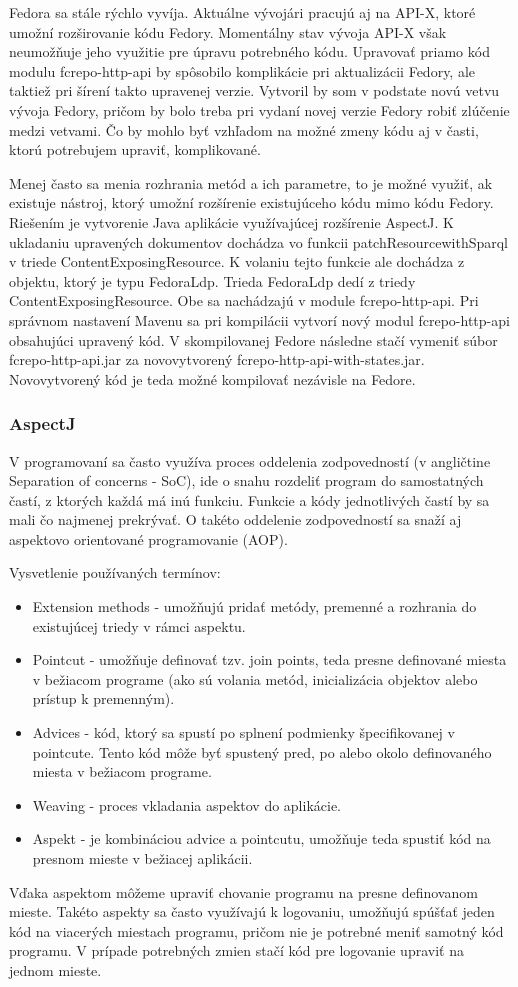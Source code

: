 \documentclass[thesis=M,slovak]{FITthesis}[2013/05/06]
\begin{document}
Fedora sa stále rýchlo vyvíja. Aktuálne vývojári pracujú aj na API-X, ktoré umožní rozširovanie kódu Fedory. Momentálny stav vývoja API-X však neumožňuje jeho využitie pre úpravu potrebného kódu. Upravovať priamo kód modulu fcrepo-http-api by spôsobilo komplikácie pri aktualizácii Fedory, ale taktiež pri šírení takto upravenej verzie. Vytvoril by som v podstate novú vetvu vývoja Fedory, pričom by bolo treba pri vydaní novej verzie Fedory robiť zlúčenie medzi vetvami. Čo by mohlo byť vzhľadom na možné zmeny kódu aj v časti, ktorú potrebujem upraviť, komplikované.

Menej často sa menia rozhrania metód a ich parametre, to je možné využiť, ak existuje nástroj, ktorý umožní rozšírenie existujúceho kódu mimo kódu Fedory. Riešením je vytvorenie Java aplikácie využívajúcej rozšírenie AspectJ. K ukladaniu upravených dokumentov dochádza vo funkcii patchResourcewithSparql v triede ContentExposingResource. K volaniu tejto funkcie ale dochádza z objektu, ktorý je typu FedoraLdp. Trieda FedoraLdp dedí z triedy ContentExposingResource. Obe sa nachádzajú v module fcrepo-http-api. Pri správnom nastavení Mavenu sa pri kompilácii vytvorí nový modul fcrepo-http-api obsahujúci upravený kód. V skompilovanej Fedore následne stačí vymeniť súbor fcrepo-http-api.jar za novovytvorený fcrepo-http-api-with-states.jar. Novovytvorený kód je teda možné kompilovať nezávisle na Fedore.

\subsubsection{AspectJ}
V programovaní sa často využíva proces oddelenia zodpovedností (v angličtine Separation of concerns - SoC), ide o snahu rozdeliť program do samostatných častí, z ktorých každá má inú funkciu. Funkcie a kódy jednotlivých častí by sa mali čo najmenej prekrývať. O takéto oddelenie zodpovedností sa snaží aj aspektovo orientované programovanie (AOP).

Vysvetlenie používaných termínov:
\begin{itemize}
	\item Extension methods - umožňujú pridať metódy, premenné a rozhrania do existujúcej triedy v rámci aspektu.
	\item Pointcut - umožňuje definovať tzv. join points, teda presne definované miesta v bežiacom programe (ako sú volania metód, inicializácia objektov alebo prístup k premenným).
	\item Advices - kód, ktorý sa spustí po splnení podmienky špecifikovanej v pointcute. Tento kód môže byť spustený pred, po alebo okolo definovaného miesta v bežiacom programe.
	\item Weaving - proces vkladania aspektov do aplikácie.
	\item Aspekt - je kombináciou advice a pointcutu, umožňuje teda spustiť kód na presnom mieste v bežiacej aplikácii.
\end{itemize}
Vďaka aspektom môžeme upraviť chovanie programu na presne definovanom mieste. Takéto aspekty sa často využívajú k logovaniu, umožňujú spúšťať jeden kód na viacerých miestach programu, pričom nie je potrebné meniť samotný kód programu. V prípade potrebných zmien stačí kód pre logovanie upraviť na jednom mieste. \cite{aspect} 
\end{document}
